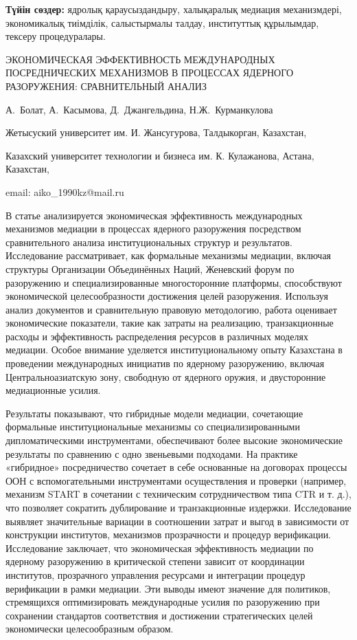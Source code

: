 {\bfseries Түйін сөздер:} ядролық қараусыздандыру, халықаралық медиация
механизмдері, экономикалық тиімділік, салыстырмалы талдау, институттық
құрылымдар, тексеру процедуралары.

\begin{header}
ЭКОНОМИЧЕСКАЯ ЭФФЕКТИВНОСТЬ МЕЖДУНАРОДНЫХ ПОСРЕДНИЧЕСКИХ МЕХАНИЗМОВ В ПРОЦЕССАХ ЯДЕРНОГО РАЗОРУЖЕНИЯ: СРАВНИТЕЛЬНЫЙ АНАЛИЗ

А.~Болат,
А.~Касымова\envelope,
Д.~Джангельдина,
Н.Ж.~Курманкулова
\end{header}

\begin{affil}
Жетысуский университет им. И. Жансугурова, Талдыкорган, Казахстан,

Казахский университет технологии и бизнеса им. К. Кулажанова, Астана, Казахстан,

email: aiko\_1990kz@mail.ru
\end{affil}

В статье анализируется экономическая эффективность международных
механизмов медиации в процессах ядерного разоружения посредством
сравнительного анализа институциональных структур и результатов.
Исследование рассматривает, как формальные механизмы медиации, включая
структуры Организации Объединённых Наций, Женевский форум по разоружению
и специализированные многосторонние платформы, способствуют
экономической целесообразности достижения целей разоружения. Используя
анализ документов и сравнительную правовую методологию, работа оценивает
экономические показатели, такие как затраты на реализацию,
транзакционные расходы и эффективность распределения ресурсов в
различных моделях медиации. Особое внимание уделяется институциональному
опыту Казахстана в проведении международных инициатив по ядерному
разоружению, включая Центральноазиатскую зону, свободную от ядерного
оружия, и двусторонние медиационные усилия.

Результаты показывают, что гибридные модели медиации, сочетающие
формальные институциональные механизмы со специализированными
дипломатическими инструментами, обеспечивают более высокие экономические
результаты по сравнению с одно звеньевыми подходами. На практике
«гибридное» посредничество сочетает в себе основанные на договорах
процессы ООН с вспомогательными инструментами осуществления и проверки
(например, механизм START в сочетании с техническим сотрудничеством типа
CTR и т. д.), что позволяет сократить дублирование и транзакционные
издержки. Исследование выявляет значительные вариации в соотношении
затрат и выгод в зависимости от конструкции институтов, механизмов
прозрачности и процедур верификации. Исследование заключает, что
экономическая эффективность медиации по ядерному разоружению в
критической степени зависит от координации институтов, прозрачного
управления ресурсами и интеграции процедур верификации в рамки медиации.
Эти выводы имеют значение для политиков, стремящихся оптимизировать
международные усилия по разоружению при сохранении стандартов
соответствия и достижении стратегических целей экономически
целесообразным образом.

